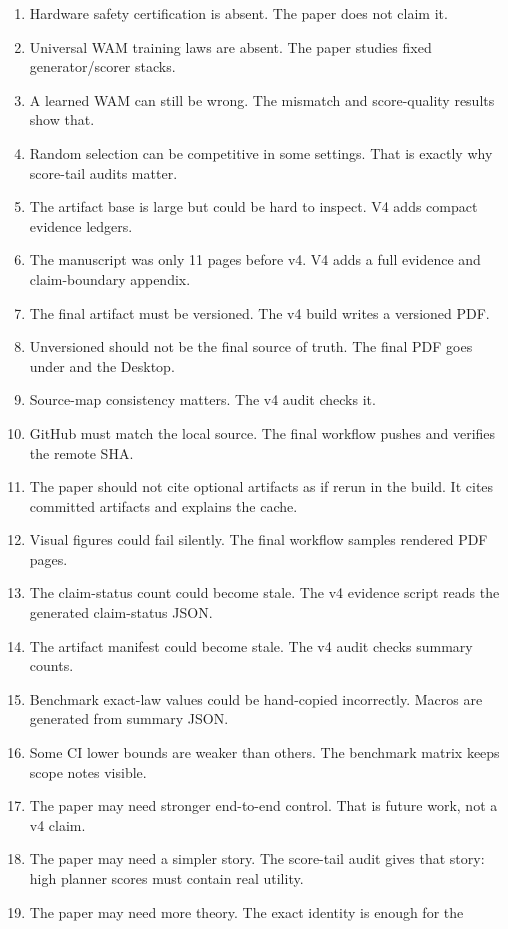 \begin{enumerate}
\item Hardware safety certification is absent. The paper does not claim it.
\item Universal WAM training laws are absent. The paper studies fixed
generator/scorer stacks.
\item A learned WAM can still be wrong. The mismatch and score-quality results
show that.
\item Random selection can be competitive in some settings. That is exactly
why score-tail audits matter.
\item The artifact base is large but could be hard to inspect. V4 adds compact
evidence ledgers.
\item The manuscript was only 11 pages before v4. V4 adds a full evidence and
claim-boundary appendix.
\item The final artifact must be versioned. The v4 build writes a versioned
PDF.
\item Unversioned  should not be the final source of
truth. The final PDF goes under  and the Desktop.
\item Source-map consistency matters. The v4 audit checks it.
\item GitHub must match the local source. The final workflow pushes and
verifies the remote SHA.
\item The paper should not cite optional artifacts as if rerun in the build.
It cites committed artifacts and explains the cache.
\item Visual figures could fail silently. The final workflow samples rendered
PDF pages.
\item The claim-status count could become stale. The v4 evidence script reads
the generated claim-status JSON.
\item The artifact manifest could become stale. The v4 audit checks summary
counts.
\item Benchmark exact-law values could be hand-copied incorrectly. Macros are
generated from summary JSON.
\item Some CI lower bounds are weaker than others. The benchmark matrix keeps
scope notes visible.
\item The paper may need stronger end-to-end control. That is future work, not
a v4 claim.
\item The paper may need a simpler story. The score-tail audit gives that
story: high planner scores must contain real utility.
\item The paper may need more theory. The exact identity is enough for the

\end{enumerate}
